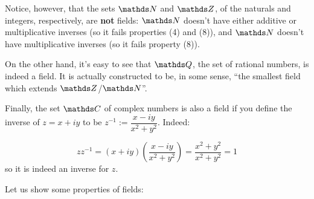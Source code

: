 \begin{ex}
	Notice, however, that the sets $\N$ and $\Z$, of the naturals and integers, respectively, are \textbf{not} fields: $\N$ doesn't have either additive or multiplicative inverses (so it fails properties (4) and (8)), and $\N$ doesn't have multiplicative inverses (so it fails property (8)).
	
	On the other hand, it's easy to see that $\Q$, the set of rational numbers, is indeed a field. It is actually constructed to be, in some sense, ``the smallest field which extends $\Z$/$\N$''.
	
	Finally, the set $\C$ of complex numbers is also a field if you define the inverse of $z=x+iy$ to be $z^{-1}:=\dfrac{x-iy}{x^2+y^2}$. Indeed:
	
	\[zz^{-1}=(x+iy)\left(\frac{x-iy}{x^2+y^2}\right)=\frac{x^2+y^2}{x^2+y^2}=1\]so it is indeed an inverse for $z$.
\end{ex}

Let us show some properties of fields:

